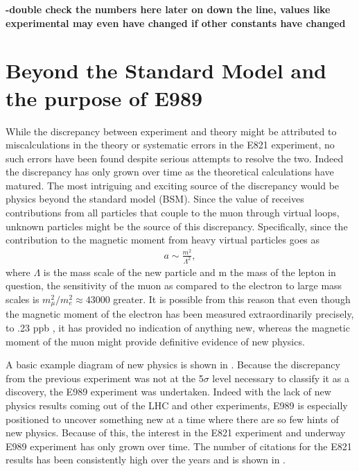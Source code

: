 \textbf{-double check the numbers here later on down the line, values like \amu experimental may even have changed if other constants have changed}




\section{Beyond the Standard Model and the purpose of E989}
\label{sec:BSM}


While the discrepancy between experiment and theory might be attributed to miscalculations in the theory or systematic errors in the E821 experiment, no such errors have been found despite serious attempts to resolve the two. Indeed the discrepancy has only grown over time as the theoretical calculations have matured. The most intriguing and exciting source of the discrepancy would be physics beyond the standard model (BSM). Since the value of \amu receives contributions from all particles that couple to the muon through virtual loops, unknown particles might be the source of this discrepancy. Specifically, since the contribution to the magnetic moment from heavy virtual particles goes as 
		\begin{align}
            a \sim \frac{m^{2}}{\Lambda^{2}},
		\end{align}
where $\Lambda$ is the mass scale of the new particle and m the mass of the lepton in question, the sensitivity of the muon as compared to the electron to large mass scales is $ m_{\mu}^{2} / m_{e}^{2} \approx 43000$ greater. It is possible from this reason that even though the magnetic moment of the electron has been measured extraordinarily precisely, to .23 ppb \cite{ElectronMDM,CODATA}, it has provided no indication of anything new, whereas the magnetic moment of the muon might provide definitive evidence of new physics.

A basic example diagram of new physics is shown in . Because the discrepancy from the previous experiment was not at the 5$\sigma$ level necessary to classify it as a discovery, the E989 experiment was undertaken. Indeed with the lack of new physics results coming out of the LHC and other experiments, E989 is especially positioned to uncover something new at a time where there are so few hints of new physics. Because of this, the interest in the E821 experiment and underway E989 experiment has only grown over time. The number of citations for the E821 results has been consistently high over the years and is shown in .

